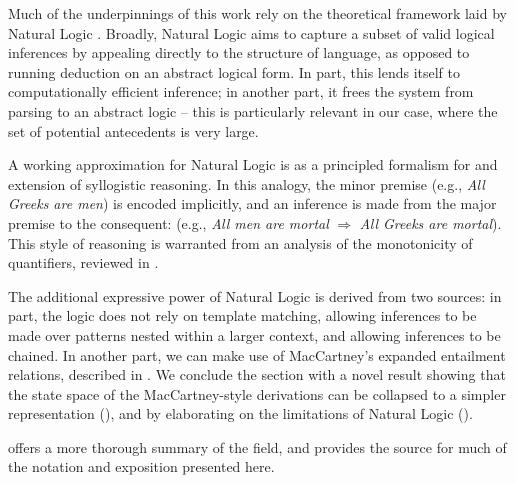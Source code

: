 Much of the underpinnings of this work rely on the theoretical framework
  laid by Natural Logic
  \cite{key:1986benthem-natlog,key:1991valencia-natlog}.
Broadly, Natural Logic aims to capture a subset of valid logical
  inferences by appealing directly to the structure of language,
  as opposed to running deduction on an abstract logical form.
In part, this lends itself to computationally efficient inference;
  in another part, it frees the system from parsing to an abstract
  logic -- this is particularly relevant in our case, where the set
  of potential antecedents is very large.

A working approximation for Natural Logic is as a principled formalism
  for and extension of syllogistic reasoning.
In this analogy, the minor premise
  (e.g., \textit{All Greeks are men}) is encoded implicitly,
  and an inference is made from the major premise to the consequent:
  (e.g., \textit{All men are mortal} $\Rightarrow$ \textit{All Greeks are mortal}).
This style of reasoning is warranted from an analysis of the monotonicity
  of quantifiers, reviewed in .

The additional expressive power of Natural Logic is derived from two
  sources: in part, the logic does not rely on template matching,
  allowing inferences to be made over patterns nested within a larger
  context, and allowing inferences to be chained.
In another part, we can make use of MacCartney's expanded entailment
  relations, described in .
We conclude the section with a novel result showing that the state
  space of the MacCartney-style derivations can be collapsed to a
  simpler representation (), and by
  elaborating on the limitations of Natural Logic ().

 offers a more thorough summary of the
  field, and provides the source for much of the notation and
  exposition presented here.

